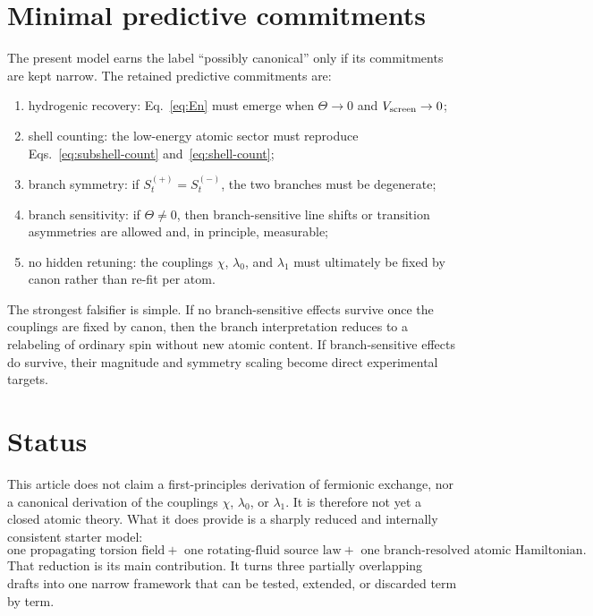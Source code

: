 \documentclass[11pt,a4paper]{article}
\begin{document}
\section{Minimal predictive commitments}
The present model earns the label ``possibly canonical'' only if its commitments are kept narrow. The retained predictive commitments are:
\begin{enumerate}[label=(P\arabic*)]
    \item hydrogenic recovery: Eq.~\eqref{eq:En} must emerge when $\Theta\to 0$ and $V_{\rm screen}\to 0$;
    \item shell counting: the low-energy atomic sector must reproduce Eqs.~\eqref{eq:subshell-count} and~\eqref{eq:shell-count};
    \item branch symmetry: if $S_t^{(+)}=S_t^{(-)}$, the two branches must be degenerate;
    \item branch sensitivity: if $\Theta\neq 0$, then branch-sensitive line shifts or transition asymmetries are allowed and, in principle, measurable;
    \item no hidden retuning: the couplings $\chi$, $\lambda_0$, and $\lambda_1$ must ultimately be fixed by canon rather than re-fit per atom.
\end{enumerate}

The strongest falsifier is simple. If no branch-sensitive effects survive once the couplings are fixed by canon, then the branch interpretation reduces to a relabeling of ordinary spin without new atomic content. If branch-sensitive effects do survive, their magnitude and symmetry scaling become direct experimental targets.

\section{Status}
This article does not claim a first-principles derivation of fermionic exchange, nor a canonical derivation of the couplings $\chi$, $\lambda_0$, or $\lambda_1$. It is therefore not yet a closed atomic theory. What it does provide is a sharply reduced and internally consistent starter model:
\begin{equation}
\boxed{
\text{one propagating torsion field}
+\text{ one rotating-fluid source law}
+\text{ one branch-resolved atomic Hamiltonian}.
}
\end{equation}
That reduction is its main contribution. It turns three partially overlapping drafts into one narrow framework that can be tested, extended, or discarded term by term.
\end{document}
